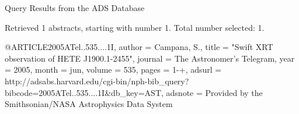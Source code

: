 Query Results from the ADS Database


Retrieved 1 abstracts, starting with number 1.  Total number selected: 1.

@ARTICLE{2005ATel..535....1I,
   author = {{Campana}, S.},
    title = "{Swift XRT observation of HETE J1900.1-2455}",
  journal = {The Astronomer's Telegram},
     year = 2005,
    month = jun,
   volume = 535,
    pages = {1-+},
   adsurl = {http://adsabs.harvard.edu/cgi-bin/nph-bib_query?bibcode=2005ATel..535....1I&db_key=AST},
  adsnote = {Provided by the Smithsonian/NASA Astrophysics Data System}
}


